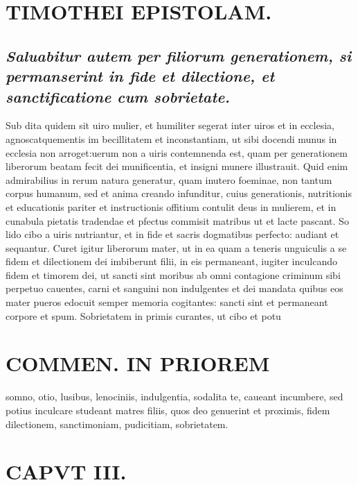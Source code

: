 \documentclass{article}
\begin{document}
\begin{pages}
\section*{TIMOTHEI EPISTOLAM. }
\marginpar{[ p.63 ]}
{}
\subsection*{\textit{Saluabitur autem per filiorum generationem, si permanserint in fide et dilectione, et sanctificatione cum sobrietate. }}\pstart Sub dita quidem sit uiro mulier, et humiliter segerat inter uiros et in ecclesia, agnoscatquementis im becillitatem et inconstantiam, ut sibi docendi munus in ecclesia non arroget:uerum non a uiris contemnenda est, quam per generationem liberorum beatam fecit dei munificentia, et insigni munere illustrauit. Quid enim admirabilius in rerum natura generatur, quam inutero foeminae, non tantum corpus humanum, sed et anima creando infunditur, cuius generationis, nutritionis et educationis pariter et instructionis offitium contulit deus in mulierem, et in cunabula pietatis tradendae et pfectus commisit matribus ut et lacte pascant. So lido cibo a uiris nutriantur, et in fide et sacris dogmatibus perfecto: audiant et sequantur. Curet igitur liberorum mater, ut in ea quam a teneris unguiculis a se fidem et dilectionem dei imbiberunt filii, in eis permaneant, iugiter inculcando fidem et timorem dei, ut sancti sint moribus ab omni contagione criminum sibi perpetuo cauentes, carni et sanguini non indulgentes et dei mandata quibus eos mater pueros edocuit semper memoria cogitantes: sancti sint et permaneant corpore et spum. Sobrietatem in primis curantes, ut cibo et potu  \pend
\section*{COMMEN. IN PRIOREM }
\marginpar{[ p.64 ]}\pstart somno, otio, lusibus, lenociniis, indulgentia, sodalita te, caueant incumbere, sed potius inculcare studeant matres filiis, quos deo genuerint et proximis, fidem dilectionem, sanctimoniam, pudicitiam, sobrietatem.  \pend
\endnumbering\beginnumbering\section{CAPVT III.}
{}

\end{pages}
\end{document}
